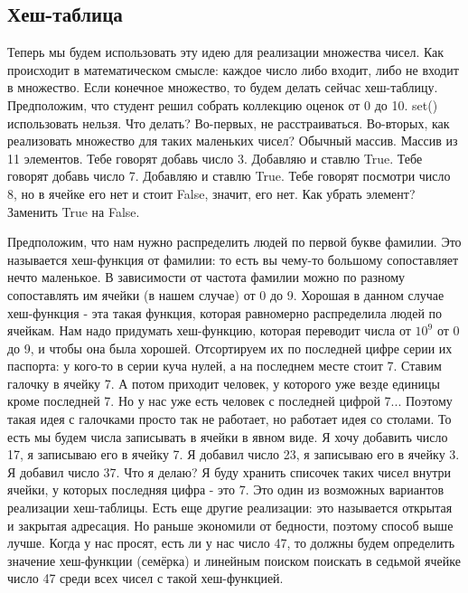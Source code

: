 \documentclass[12pt]{article}
\begin{document}
\subsection*{Хеш-таблица}
Теперь мы будем использовать эту идею для реализации множества чисел. Как происходит в математическом смысле: каждое число либо входит, либо не входит в множество. Если конечное множество, то будем делать сейчас хеш-таблицу. Предположим, что студент решил собрать коллекцию оценок от 0 до 10. set() использовать нельзя. Что делать? Во-первых, не расстраиваться. Во-вторых, как реализовать множество для таких маленьких чисел? Обычный массив. Массив из 11 элементов. Тебе говорят добавь число 3. Добавляю и ставлю True. Тебе говорят добавь число 7. Добавляю и ставлю True. Тебе говорят посмотри число 8, но в ячейке его нет и стоит False, значит, его нет. Как убрать элемент? Заменить True на False.

Предположим, что нам нужно распределить людей по первой букве фамилии. Это называется хеш-функция от фамилии: то есть вы чему-то большому сопоставляет нечто маленькое. В зависимости от частота фамилии можно по разному сопоставлять им ячейки (в нашем случае) от 0 до 9. Хорошая в данном случае хеш-функция - эта такая функция, которая равномерно распределила людей по ячейкам. Нам надо придумать хеш-функцию, которая переводит числа от $10^9$ от 0 до 9, и чтобы она была хорошей. Отсортируем их по последней цифре серии их паспорта: у кого-то в серии куча нулей, а на последнем месте стоит 7. Ставим галочку в ячейку 7. А потом приходит человек, у которого уже везде единицы кроме последней 7. Но у нас уже есть человек с последней цифрой 7... Поэтому такая идея с галочками просто так не работает, но работает идея со столами. То есть мы будем числа записывать в ячейки в явном виде. Я хочу добавить число 17, я записываю его в ячейку 7. Я добавил число 23, я записываю его в ячейку 3. Я добавил число 37. Что я делаю? Я буду хранить списочек таких чисел внутри ячейки, у которых последняя цифра - это 7. Это один из возможных вариантов реализации хеш-таблицы. Есть еще другие реализации: это называется открытая и закрытая адресация. Но раньше экономили от бедности, поэтому способ выше лучше. Когда у нас просят, есть ли у нас число 47, то должны будем определить значение хеш-функции (семёрка) и линейным поиском поискать в седьмой ячейке число 47 среди всех чисел с такой хеш-функцией. 
\end{document}
